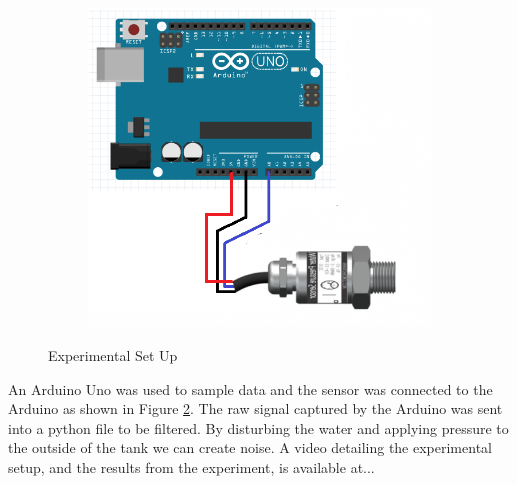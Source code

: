 \documentclass{article}
\begin{document}
\begin{figure}[H]
\centering
\begin{subfigure}{.5\textwidth}
  \centering
  
  \caption{}
  \label{fig:a}
\end{subfigure}%
\begin{subfigure}{.5\textwidth}
  \centering
  \includegraphics[scale=0.45]{pressureCircuit}
  \caption{}
  \label{fig:b}
\end{subfigure}
\caption{Experimental Set Up}
\label{fig:setUp}
\end{figure}
An Arduino Uno was used to sample data and the sensor was connected to the Arduino as shown in Figure \ref{fig:b}. The raw signal captured by the Arduino was sent into a python file to be filtered.
By disturbing the water and applying pressure to the outside of the tank we can create noise. A video detailing the experimental setup, and the results from the experiment, is available at...
 
\end{document}
